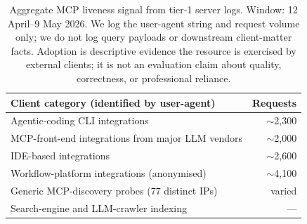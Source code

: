 \begin{table}[h]
\centering
\caption{Aggregate MCP liveness signal from tier-1 server logs. Window: 12 April--9 May 2026. We log the user-agent string and request volume only; we do not log query payloads or downstream client-matter facts. Adoption is descriptive evidence the resource is exercised by external clients; it is not an evaluation claim about quality, correctness, or professional reliance.}
\label{tab:adoption_signal}
\small
\begin{tabular}{l r}
\toprule
\textbf{Client category (identified by user-agent)} & \textbf{Requests} \\
\midrule
Agentic-coding CLI integrations & $\sim$2{,}300 \\
MCP-front-end integrations from major LLM vendors & $\sim$2{,}000 \\
IDE-based integrations & $\sim$2{,}600 \\
Workflow-platform integrations (anonymised) & $\sim$4{,}100 \\
Generic MCP-discovery probes (77 distinct IPs) & varied \\
Search-engine and LLM-crawler indexing & --- \\
\bottomrule
\end{tabular}
\end{table}
